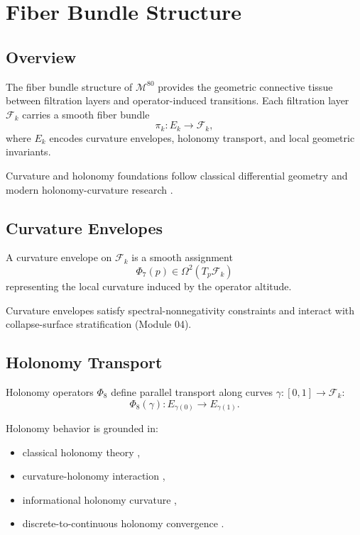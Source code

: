 
\section{Fiber Bundle Structure}
\label{sec:FiberBundleStructure}

\subsection{Overview}
The fiber bundle structure of $\mathcal{M}^{80}$ provides the geometric
connective tissue between filtration layers and operator-induced transitions.
Each filtration layer $\mathcal{F}_k$ carries a smooth fiber bundle
\[
\pi_k : E_k \to \mathcal{F}_k,
\]
where $E_k$ encodes curvature envelopes, holonomy transport, and local geometric
invariants.

Curvature and holonomy foundations follow classical differential geometry
 and modern holonomy-curvature research
.

\subsection{Curvature Envelopes}
\begin{definition}
A curvature envelope on $\mathcal{F}_k$ is a smooth assignment
\[
\Phi_7(p) \in \Omega^2(T_p\mathcal{F}_k)
\]
representing the local curvature induced by the operator altitude.
\end{definition}

Curvature envelopes satisfy spectral-nonnegativity constraints
 and interact with collapse-surface
stratification (Module 04).

\subsection{Holonomy Transport}
Holonomy operators $\Phi_8$ define parallel transport along curves
$\gamma : [0,1] \to \mathcal{F}_k$:
\[
\Phi_8(\gamma) : E_{\gamma(0)} \to E_{\gamma(1)}.
\]

Holonomy behavior is grounded in:
\begin{itemize}
    \item classical holonomy theory ,
    \item curvature-holonomy interaction ,
    \item informational holonomy curvature ,
    \item discrete-to-continuous holonomy convergence .
\end{itemize}

